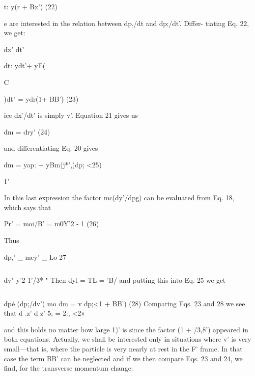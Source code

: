 t: y(r + Bx') (22)
\begin{equation}
\end{equation}

e are interested in the relation between dp,/dt and dp;/dt'. Differ-
tiating Eq. 22, we get:

dx'
dt'

dt: ydt'+ yE(

C

)dt" = ydr(1+ BB') (23)
\begin{equation}
\end{equation}

ice dx'/dt' is simply v'. Equation 21 gives us

dm = dry' (24)
\begin{equation}
\end{equation}

and differentiating Eq. 20 gives

dm = yap; + yBm(j*',)dp; <25)
\begin{equation}
\end{equation}

1'

In this last expression the factor mc(dy'/dpg) can be evaluated from
Eq. 18, which says that

Pr' = moi/B' = m0\/Y'2 - 1 (26)
\begin{equation}
\end{equation}

Thus

dp,' _ mcy' _ Lo 27

\begin{equation}
\end{equation}

dv" y'2-1'/3* "
Then dyl = TL = 'B/ and putting this into Eq. 25 we get

\begin{equation}
\end{equation}


dpé (dp;/dv') mo
dm = v dp;<1 + BB') (28)
Comparing Eqs. 23 and 28 we see that
d .z' d z'
5; = 2:, <2»

and this holds no matter how large 1)' is since the factor (1 + /3,8')
appeared in both equations. Actually, we shall be interested only in
situations where v' is very small---that is, where the particle is very
nearly at rest in the F' frame. In that case the term BB' can be neglected
and if we then compare Eqs. 23 and 24, we find, for the transverse
momentum change:

\begin{equation}
\end{equation}


